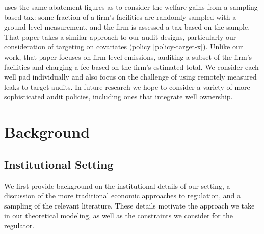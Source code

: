 \documentclass[12pt,oneside,letterpaper]{article}
\theoremstyle{definition}
\begin{document}
\begin{refsection}
\textcite{Marks:2019} uses the same abatement figures as \textcite{Marks:2021} to consider the welfare gains from a sampling-based tax: some fraction of a firm's facilities are randomly sampled with a ground-level measurement, and the firm is assessed a tax based on the sample.
That paper takes a similar approach to our audit designs, particularly our consideration of targeting on covariates (policy \ref{policy-target-x}).
Unlike our work, that paper focuses on firm-level emissions, auditing a subset of the firm's facilities and charging a fee based on the firm's estimated total.
We consider each well pad individually and also focus on the challenge of using remotely measured leaks to target audits.
In future research we hope to consider a variety of more sophisticated audit policies, including ones that integrate well ownership.


\section{Background}
\label{sec:background}

\subsection{Institutional Setting}
\label{sec:institutional-setting}

We first provide background on the institutional details of our setting, a discussion of the more traditional economic approaches to regulation, and a sampling of the relevant literature.
These details motivate the approach we take in our theoretical modeling, as well as the constraints we consider for the regulator.


\end{refsection}
\end{document}
